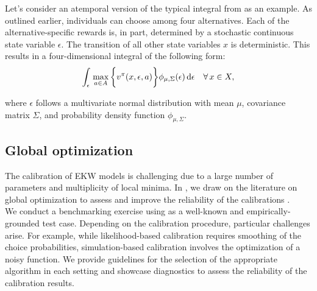 \noindent Let's consider an atemporal version of the typical integral from \citet{Keane.1994} as an example. As outlined earlier, individuals can choose among four alternatives. Each of the alternative-specific rewards is, in part, determined by a stochastic continuous state variable $\epsilon$. The transition of all other state variables $x$ is deterministic. This results in a four-dimensional integral of the following form:
%
\begin{align*}
   \int_{\epsilon}\, \max_{a\in A} \bigg\{v^\pi(x, \epsilon, a)\bigg\} \phi_{\mu, \Sigma}(\epsilon) \mathop{}\!\mathrm{d}\epsilon \quad\forall\, x \in X,
\end{align*}

\noindent where $\epsilon$ follows a multivariate normal distribution with mean $\mu$, covariance matrix $ \Sigma$, and probability density function $\phi_{\mu, \Sigma}$.
\subsection{Global optimization}
The calibration of EKW models is challenging due to a large number of parameters and multiplicity of local minima. In \citet{Gabler.2020}, we draw on the literature on global optimization to assess and improve the reliability of the calibrations \citep{Locatelli.2013, Nocedal.2006}.\\

\noindent We conduct a benchmarking exercise using \citet{Keane.1994, Keane.1997} as a well-known and empirically-grounded test case. Depending on the calibration procedure, particular challenges arise. For example, while likelihood-based calibration requires smoothing of the choice probabilities, simulation-based calibration involves the optimization of a noisy function. We provide guidelines for the selection of the appropriate algorithm in each setting and showcase diagnostics to assess the reliability of the calibration results.
